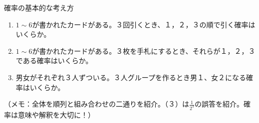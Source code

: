 \documentclass[12pt,a4paper]{jsarticle}
\begin{document}
確率の基本的な考え方
\begin{enumerate}
    \item $1\sim6$が書かれたカードがある。３回引くとき、１，２，３の順で引く確率はいくらか。
    \item $1\sim6$が書かれたカードがある。３枚を手札にするとき、それらが１，２，３である確率はいくらか。
    \item 男女がそれぞれ３人ずついる。３人グループを作るとき男１、女２になる確率はいくらか。
\end{enumerate}
（メモ：全体を順列と組み合わせの二通りを紹介。（３）は$\frac{1}{2^3}$の誤答を紹介。確率は意味や解釈を大切に！）
\end{document}
